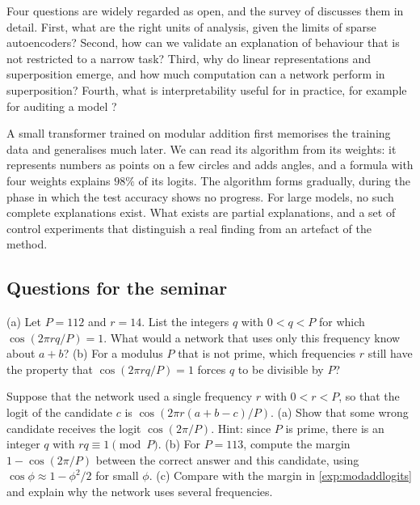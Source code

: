 Four questions are widely regarded as open, and the survey of \citet{sharkey2025open} discusses them in detail.
First, what are the right units of analysis, given the limits of sparse autoencoders? Second, how can we validate
an explanation of behaviour that is not restricted to a narrow task? Third, why do linear representations and
superposition emerge, and how much computation can a network perform in superposition? Fourth, what is
interpretability useful for in practice, for example for auditing a model
\citep{marks2025auditing}?

\begin{takeaways}
A small transformer trained on modular addition first memorises the training data and generalises much later.
We can read its algorithm from its weights: it represents numbers as points on a few circles and adds angles, and a
formula with four weights explains $98\%$ of its logits. The algorithm forms gradually, during the phase in which
the test accuracy shows no progress. For large models, no such complete explanations exist. What exists are
partial explanations, and a set of control experiments that distinguish a real finding from an artefact of the
method.
\end{takeaways}

\subsection*{Questions for the seminar}

\begin{exercise}\label{ex:cosprime}
(a) Let $P=112$ and $r=14$. List the integers $q$ with $0<q<P$ for which $\cos(2\pi rq/P)=1$. What would a network
that uses only this frequency know about $a+b$? (b) For a modulus $P$ that is not prime, which frequencies $r$
still have the property that $\cos(2\pi rq/P)=1$ forces $q$ to be divisible by $P$?
\end{exercise}

\begin{exercise}\label{ex:onefreq}
Suppose that the network used a single frequency $r$ with $0<r<P$, so that the logit of the candidate $c$ is
$\cos(2\pi r(a+b-c)/P)$. (a) Show that some wrong candidate receives the logit $\cos(2\pi/P)$. Hint: since $P$ is
prime, there is an integer $q$ with $rq\equiv1\pmod P$. (b) For $P=113$, compute the margin $1-\cos(2\pi/P)$
between the correct answer and this candidate, using $\cos\phi\approx1-\phi^2/2$ for small $\phi$. (c) Compare
with the margin in \cref{exp:modaddlogits} and explain why the network uses several frequencies.
\end{exercise}

